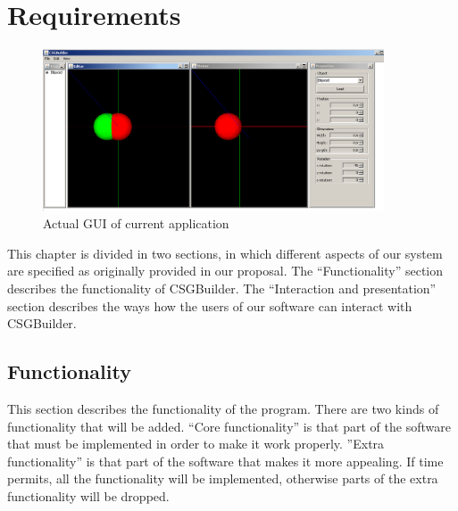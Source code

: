 \documentclass[a4paper,10pt,twocolumn]{article}
\begin{document}
\section{Requirements}
\begin{figure}[t!]
\centering
\includegraphics[width = 0.9\textwidth]{images/gui}
\caption{Actual GUI of current application}
\label{figure:gui}
\end{figure}
This chapter is divided in two sections, in which different aspects of our system are specified as originally provided in our proposal. The ``Functionality'' section describes the functionality of CSGBuilder. The ``Interaction and presentation'' section describes the ways how the users of our software can interact with CSGBuilder.

\subsection{Functionality}
This section describes the functionality of the program. There are two kinds of functionality that will be added. ``Core functionality'' is that part of the software that must be implemented in order to make it work properly. ''Extra functionality'' is that part of the software that makes it more appealing. If time permits, all the functionality will be implemented, otherwise parts of the extra functionality will be dropped.
\end{document}
